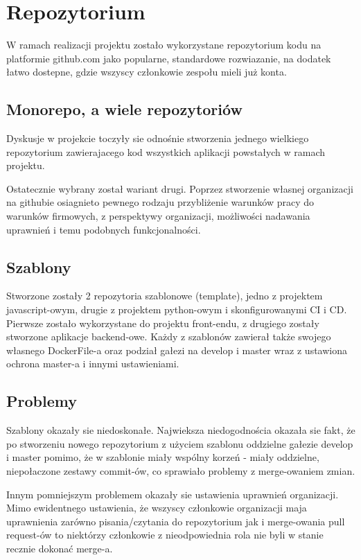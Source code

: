 \newpage

\section{Repozytorium}
W ramach realizacji projektu zostało wykorzystane repozytorium kodu na platformie github.com jako popularne, standardowe rozwiazanie, na dodatek łatwo dostepne, gdzie wszyscy członkowie zespołu mieli już konta.

\subsection{Monorepo, a wiele repozytoriów}
Dyskusje w projekcie toczyły sie odnośnie stworzenia jednego wielkiego repozytorium zawierajacego kod wszystkich aplikacji powstałych w ramach projektu.

Ostatecznie wybrany został wariant drugi. Poprzez stworzenie własnej organizacji na githubie osiagnieto pewnego rodzaju przybliżenie warunków pracy do warunków firmowych, z perspektywy organizacji, możliwości nadawania uprawnień i temu podobnych funkcjonalności.

\subsection{Szablony}
Stworzone zostały 2 repozytoria szablonowe (template), jedno z projektem javascript-owym, drugie z projektem python-owym i skonfigurowanymi CI i CD. Pierwsze zostało wykorzystane do projektu front-endu, z drugiego zostały stworzone aplikacje backend-owe. Każdy z szablonów zawierał także swojego własnego DockerFile-a oraz podział gałezi na develop i master wraz z ustawiona ochrona master-a i innymi ustawieniami.

\subsection{Problemy}
Szablony okazały sie niedoskonałe. Najwieksza niedogodnościa okazała sie fakt, że po stworzeniu nowego repozytorium z użyciem szablonu oddzielne gałezie develop i master pomimo, że w szablonie miały wspólny korzeń - miały oddzielne, niepołaczone zestawy commit-ów, co sprawiało problemy z merge-owaniem zmian.

Innym pomniejszym problemem okazały sie ustawienia uprawnień organizacji. Mimo ewidentnego ustawienia, że wszyscy członkowie organizacji maja uprawnienia zarówno pisania/czytania do repozytorium jak i merge-owania pull request-ów to niektórzy członkowie z nieodpowiednia rola nie byli w stanie recznie dokonać merge-a.

